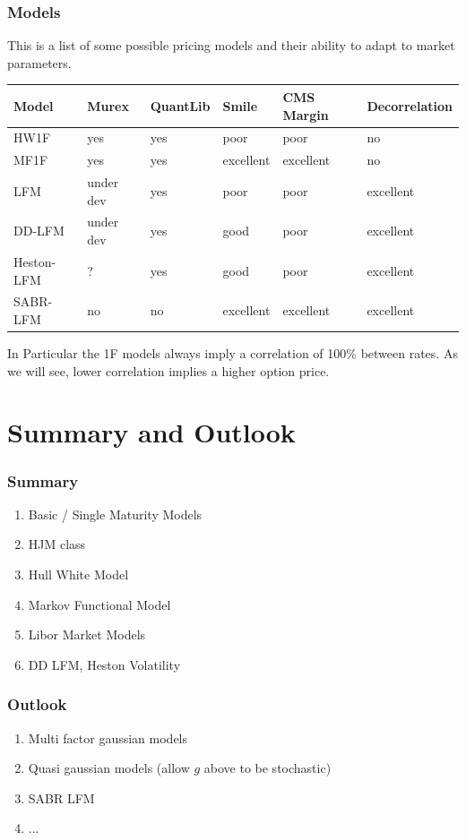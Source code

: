 \documentclass{beamer}
\begin{document}
\begin{frame}
\frametitle{Models}
This is a list of some possible pricing models and their ability to adapt to market parameters.
\begin{table}[ht]
\small
\begin{tabular}{l | l | l | l | l | l}
Model&Murex&QuantLib&Smile&CMS Margin&Decorrelation\\ \hline
HW1F&yes&yes&poor&poor&no \\
MF1F&yes&yes&excellent&excellent&no \\
LFM&under dev&yes&poor&poor&excellent \\
DD-LFM&under dev&yes&good&poor&excellent \\
Heston-LFM&?&yes&good&poor&excellent \\
SABR-LFM&no&no&excellent&excellent&excellent
\end{tabular}
\end{table}

In Particular the 1F models always imply a correlation of 100\% between rates. As we will see, lower
correlation implies a higher option price.
\end{frame}


\section{Summary and Outlook}

\begin{frame}
\frametitle{Summary}
\begin{enumerate}
\item Basic / Single Maturity Models
\item HJM class
\item Hull White Model
\item Markov Functional Model
\item Libor Market Models
\item DD LFM, Heston Volatility
\end{enumerate}
\end{frame}

\begin{frame}
\frametitle{Outlook}
\begin{enumerate}
\item Multi factor gaussian models
\item Quasi gaussian models (allow $g$ above to be stochastic)
\item SABR LFM
\item ...
\end{enumerate}
\end{frame}
\end{document}
